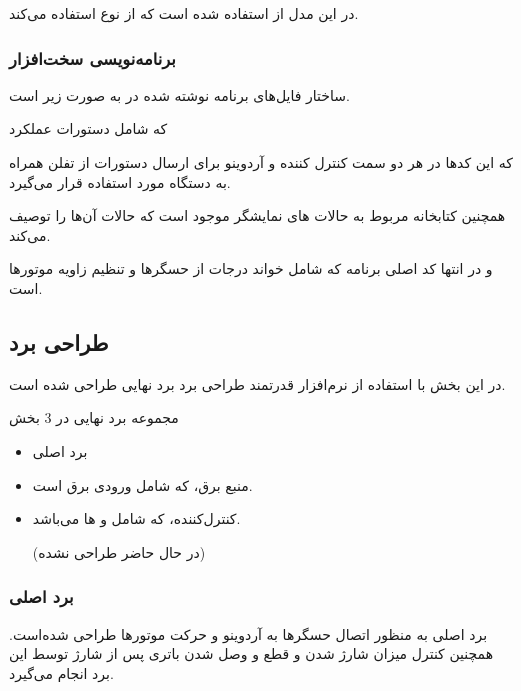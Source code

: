 \documentclass[a4paper,12pt]{report}
\begin{document}
	در این مدل از
	استفاده شده است که از
	نوع
	استفاده می‌کند.

	\subsubsection{
	برنامه‌نویسی سخت‌افزار
	}\label{subsubsec2:subsec1:sec3:chap2}
	ساختار فایل‌های برنامه نوشته شده در
	به صورت زیر است.

	که شامل دستورات عملکرد

	که این کدها در هر دو سمت کنترل کننده و آردوینو برای ارسال دستورات از تفلن همراه به دستگاه مورد استفاده قرار می‌گیرد.

	همچنین کتابخانه مربوط به حالات
	های نمایشگر موجود است که حالات آن‌ها را توصیف می‌کند.

	و در انتها  کد اصلی برنامه که شامل خواند درجات از حسگر‌ها و تنظیم زاویه موتورها است.
	\begin{latin}
	\end{latin}

	\subsection{
		طراحی برد
	}\label{subsec2:sec3:chap2}
		در این بخش با استفاده از نرم‌افزار قدرتمند طراحی برد
		برد نهایی طراحی شده است.

		مجموعه برد نهایی در
		$ 3 $
		بخش
		\begin{itemize}[nosep]
			\item
				برد اصلی
			\item
				منبع برق، ‌که شامل ورودی برق است.
			\item
				کنترل‌کننده، که شامل
				و
				ها می‌باشد.

				\danger
				(در حال حاضر طراحی نشده)
		\end{itemize}

	\subsubsection{
	برد اصلی
	}\label{subsubsec1:subsec2:sec3:chap2}
		برد اصلی به منظور اتصال حسگر‌ها به آردوینو و حرکت موتور‌ها طراحی شده‌است.
		همچنین کنترل میزان شارژ شدن و قطع و وصل شدن باتری پس از شارژ توسط این برد انجام می‌گیرد.
\end{document}
